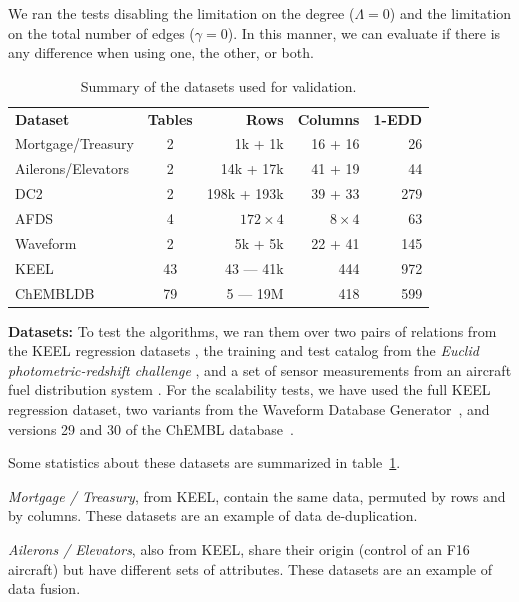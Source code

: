 We ran the tests disabling the limitation on the degree ($\Lambda = 0$) and
the limitation on the total number of edges ($\gamma = 0$). In this manner, we can
evaluate if there is any difference when using one, the other, or both.

\begin{table}[ht]
    \caption{Summary of the datasets used for validation.}
    \label{tab:dataset_summary}
    \centering
    \begin{tabular}{l c r r r}
        \textbf{Dataset}   & \textbf{Tables} & \textbf{Rows} & \textbf{Columns} & \textbf{1-EDD} \\
        Mortgage/Treasury  & 2               &   1k + 1k   & 16 + 16 &  26 \\
        Ailerons/Elevators & 2               &  14k + 17k  & 41 + 19 &  44  \\
        DC2                & 2               & 198k + 193k & 39 + 33 & 279 \\
        AFDS               & 4               & $172 \times 4$ & $8 \times 4$ & 63 \\
        Waveform           & 2               & 5k + 5k     & 22 + 41 & 145 \\
        KEEL      & 43              & 43 --- 41k  & 444 & 972 \\
        ChEMBLDB           & 79              & 5 --- 19M   & 418 & 599 \\
    \end{tabular}
\end{table}

\textbf{Datasets:} To test the algorithms, we ran them over two pairs of relations from the KEEL
regression datasets \cite{alcala2011keel}, the training and test catalog from the
\textit{Euclid photometric-redshift challenge} \cite{EuclidDesprez2020},
and a set of sensor measurements from an aircraft fuel distribution
system \cite{Gheraibia2019}. For the scalability tests, we have used the full
KEEL regression dataset, two variants from the Waveform Database
Generator~\cite{Dua:2019,breiman_classification_1984},
and versions 29 and 30 of the ChEMBL database~\cite{gaulton_chembl_2016}.

Some statistics about these datasets are summarized in table~\ref{tab:dataset_summary}.

\emph{Mortgage / Treasury}, from KEEL, contain the same data, permuted by rows and by 
columns. These datasets are an example of data de-duplication.

\emph{Ailerons / Elevators}, also from KEEL, share their origin (control of an F16 
aircraft) but have different sets of attributes. These datasets are an example of 
data fusion.

